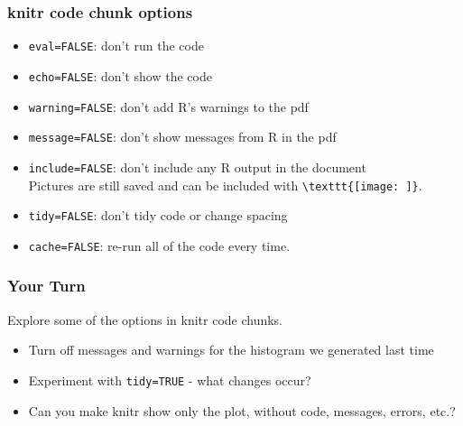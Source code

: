 \documentclass{beamer}\usepackage[]{graphicx}\usepackage[]{color}
\begin{document}
\begin{frame}[fragile]
\frametitle{knitr code chunk options}
\begin{itemize}
\item \texttt{eval=FALSE}: don't run the code
\item \texttt{echo=FALSE}: don't show the code\bigskip
\item \texttt{warning=FALSE}: don't add R's warnings to the pdf
\item \texttt{message=FALSE}: don't show messages from R in the pdf\bigskip
\item \texttt{include=FALSE}: don't include any R output in the document\\
Pictures are still saved and can be included with \verb|\texttt{[image: ]}|.
\item \texttt{tidy=FALSE}: don't tidy code or change spacing
\item \texttt{cache=FALSE}: re-run all of the code every time.
\end{itemize}
\end{frame}


\begin{frame}
\frametitle{Your Turn}
Explore some of the options in knitr code chunks. 
\begin{itemize}
\item Turn off messages and warnings for the histogram we generated last time
\item Experiment with \texttt{tidy=TRUE} - what changes occur?
\item Can you make knitr show only the plot, without code, messages, errors, etc.?
\end{itemize}
\end{frame}

\end{document}
